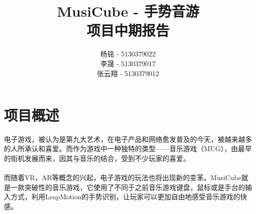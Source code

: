 \documentclass{article}
\title{MusiCube - 手势音游\\
       项目中期报告}
\author{杨铭 - 5130379022\\
        李晟 - 5130379017\\
        张云翔 - 5130379012}
\begin{document}
\maketitle
\tableofcontents
\newpage
\section{项目概述}
\paragraph{}
电子游戏，被认为是第九大艺术，在电子产品和网络愈发普及的今天，被越来越多的人所承认和喜爱。而作为游戏中一种独特的类型——音乐游戏（MUG），由最早的街机发展而来，因其与音乐的结合，受到不少玩家的喜爱。
\paragraph{}
而随着VR，AR等概念的兴起，电子游戏的玩法也将出现新的变革。MusiCube就是一款突破性的音乐游戏，它使用了不同于之前音乐游戏键盘，鼠标或是手台的输入方式，利用LeapMotion的手势识别，让玩家可以更加自由地感受音乐游戏的快感。
\end{document}
